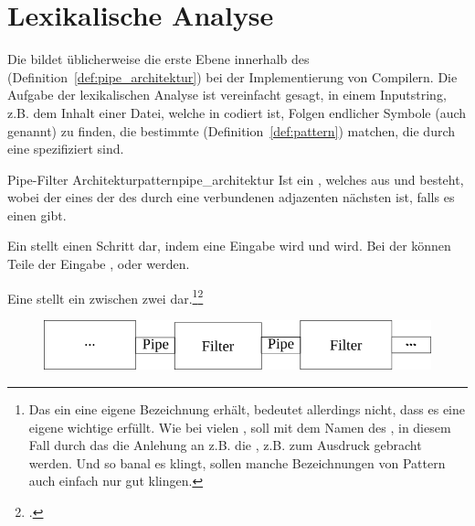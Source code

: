 \section{Lexikalische Analyse}
\label{sec:lexikalische_analyse}

Die  bildet üblicherweise die erste Ebene innerhalb des  (Definition~\ref{def:pipe_architektur}) bei der Implementierung von Compilern. Die Aufgabe der lexikalischen Analyse ist vereinfacht gesagt, in einem Inputstring, z.B. dem Inhalt einer Datei, welche in  codiert ist, Folgen endlicher Symbole (auch  genannt) zu finden, die bestimmte  (Definition~\ref{def:pattern}) matchen, die durch eine  spezifiziert sind.

\begin{Definition}{Pipe-Filter Architekturpattern}{pipe_architektur}
  Ist ein , welches aus  und  besteht, wobei der  eines  der  des durch eine  verbundenen adjazenten nächsten  ist, falls es einen gibt.

  Ein  stellt einen Schritt dar, indem eine Eingabe  wird und  wird. Bei der  können Teile der Eingabe ,  oder  werden.

  Eine  stellt ein  zwischen zwei  dar.\footnote{Das ein  eine eigene Bezeichnung erhält, bedeutet allerdings nicht, dass es eine eigene wichtige  erfüllt. Wie bei vielen , soll mit dem Namen des , in diesem Fall durch das  die Anlehung an z.B. die , z.B.  zum Ausdruck gebracht werden. Und so banal es klingt, sollen manche Bezeichnungen von Pattern auch einfach nur gut klingen.}\footcite{westphal_softwaretechnik_2021}

  \begin{figure}[H]
    \centering
    \includegraphics[width=0.66\linewidth]{./figures/pipe_architecture.png}
  \end{figure}
\end{Definition}

